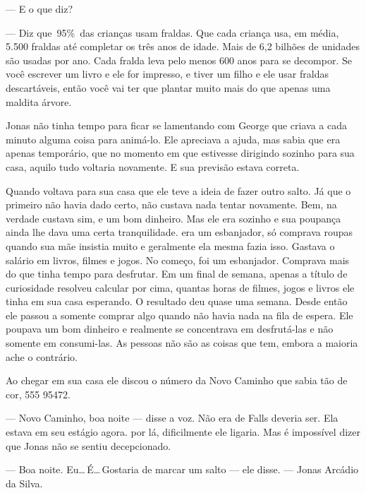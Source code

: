 --- E o que diz?

--- Diz que~95\%~das crianças usam fraldas. Que cada criança usa, em média, 5.500 fraldas até completar os três anos de idade. Mais de 6,2 bilhões de unidades são usadas por ano. Cada fralda leva pelo menos 600 anos para se decompor. Se você escrever um livro e ele for impresso, e tiver um filho e ele usar fraldas descartáveis, então você vai ter que plantar muito mais do que apenas uma maldita árvore.

Jonas não tinha tempo para ficar se lamentando com George\mudanca{,} que criava a cada minuto alguma coisa para animá-lo. Ele apreciava a ajuda, mas sabia que era apenas temporário, que no momento em que estivesse dirigindo sozinho para sua casa, aquilo tudo voltaria novamente. E sua previsão estava correta.

Quando voltava para sua casa que ele teve a ideia de fazer outro salto. Já que o primeiro não havia dado certo, não custava nada tentar novamente. Bem, na verdade\mudanca{,} custava\mudanca{,} sim, e um bom dinheiro. Mas ele era sozinho e sua poupança ainda lhe dava uma certa tranquilidade.  era um esbanjador, só comprava roupas quando sua mãe insistia muito e\mudanca{,} geralmente\mudanca{,} ela mesma fazia isso. Gastava o salário em livros, filmes e jogos. No começo, foi um esbanjador. Comprava mais do que tinha tempo para desfrutar. Em um final de semana, apenas a título de curiosidade\mudanca{,} resolveu calcular\mudanca{,} por cima, quantas horas de filmes, jogos e livros ele tinha em sua casa esperando. O resultado deu quase uma semana. Desde então ele passou a somente comprar algo quando não havia nada na fila de espera. Ele poupava um bom dinheiro e realmente se concentrava em desfrutá-las e não somente em consumi-las. As pessoas não são as coisas que tem, embora a maioria ache o contrário.

Ao chegar em sua casa\mudanca{,} ele discou o número da Novo Caminho que sabia tão de cor, 555 95472.

--- Novo Caminho, boa noite --- disse a voz. Não era de Falls deveria ser. Ela estava em seu estágio agora.  por lá, dificilmente ele ligaria. Mas é impossível dizer que Jonas não se sentiu decepcionado.

--- Boa noite. Eu\ldots\,É\ldots\,Gostaria de marcar um salto --- ele disse. --- Jonas Arcádio da Silva.

